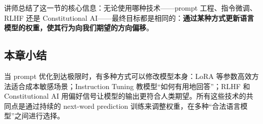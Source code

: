 讲师总结了这一节的核心信息：无论使用哪种技术——prompt 工程、指令微调、RLHF 还是 Constitutional AI——最终目标都是相同的：\textbf{通过某种方式更新语言模型的权重，使其行为向我们期望的方向偏移}。

\subsection{本章小结}

当 prompt 优化到达极限时，有多种方式可以修改模型本身：LoRA 等参数高效方法适合成本敏感场景；Instruction Tuning 教模型``如何有用地回答''；RLHF 和 Constitutional AI 用偏好信号让模型的输出更符合人类期望。所有这些技术的共同点是通过持续的 next-word prediction 训练来调整权重，在多种``合法语言模型''之间进行选择。

